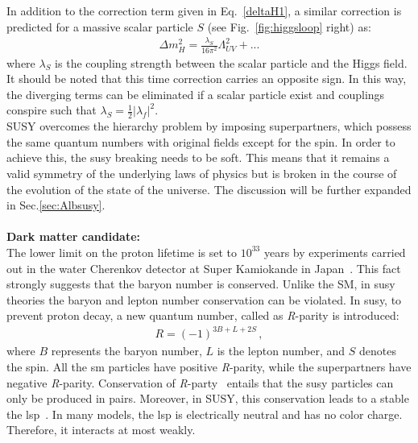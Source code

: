 In addition to the correction term given in Eq.~\ref{deltaH1}, a similar correction is predicted for a massive scalar particle $S$ (see Fig.~\ref{fig:higgsloop} right) as:
\begin{eqnarray}
\label{deltaH2}
{\Delta m_H^2 =  \frac{\lambda_S}{16\pi^2}\Lambda_{UV}^2+...}
\end{eqnarray}
where $\lambda_S$ is the coupling strength between the scalar particle and the Higgs field. 
It should be noted that this time correction carries an opposite sign. In this way, the diverging terms can be eliminated if a scalar particle exist and couplings conspire such that $\lambda_S = \frac{1}{2}|\lambda_f|^2$.\\
SUSY overcomes the hierarchy problem by imposing superpartners, which possess the same quantum numbers with original fields except for the spin.
In order to achieve  this, the \acrshort{susy} breaking needs to be soft. This means that it remains a valid symmetry of the underlying laws of physics but is broken in the course of the evolution of the state of the universe. The discussion will be further expanded in Sec.\ref{sec:Albsusy}.
\\
\\
\textbf{Dark matter candidate:}
\\
The lower limit on the proton lifetime is set to $10^{33}$ years by experiments carried out in the water Cherenkov detector at Super Kamiokande in Japan~\cite{protonLifetime}. This fact strongly suggests that the baryon number is conserved.  Unlike the SM, in \acrshort{susy} theories the baryon and lepton number conservation can be violated. In \acrshort{susy}, to prevent proton decay, a new quantum number, called as {\it R}-parity is introduced: 
\begin{eqnarray}
\label{Rparity}
{R =  (-1)^{3B+L+2S}}\,,
\end{eqnarray}
where $B$ represents the baryon number, $L$ is the lepton number, and $S$ denotes the spin.
All the \acrshort{sm} particles have positive {\it R}-parity, while the superpartners have negative {\it R}-parity. Conservation of {\it R}-party~\cite{RparityConv} entails that the \acrshort{susy} particles can only be produced in pairs. Moreover, in SUSY, this conservation leads to a stable the \acrfull{lsp}~\cite{LSP1,LSP2}.
In many models, the \acrshort{lsp} is electrically neutral and has no color charge. Therefore, it interacts at most weakly.
